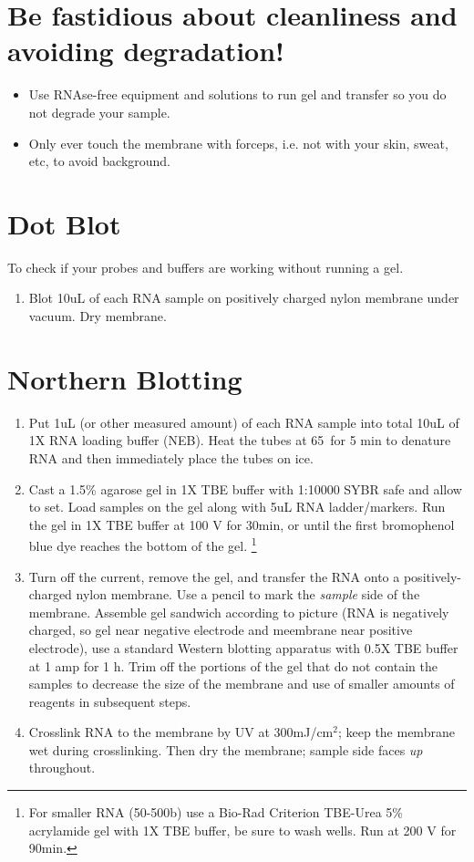 \documentclass{article}
\begin{document}
\section*{Be fastidious about cleanliness and avoiding degradation!}

\begin{itemize}
\item Use RNAse-free equipment and solutions to run gel and transfer so you do not degrade your sample.
\item Only ever touch the membrane with forceps, i.e. not with your skin, sweat, etc, to avoid background.
\end{itemize}
  

\section*{Dot Blot}

To check if your probes and buffers are working without running a gel.

\begin{enumerate}
\item Blot 10uL of each RNA sample on positively charged nylon membrane under vacuum. Dry membrane.
\end{enumerate}

\section*{Northern Blotting}
\begin{enumerate}
\item Put 1uL (or other measured amount) of each RNA sample into total 10uL of 1X RNA loading buffer (NEB). Heat the tubes at 65\celsius\  for 5 min to denature RNA and then immediately place the tubes on ice. 
\item Cast a 1.5\% agarose gel in 1X TBE buffer with 1:10000 SYBR safe and allow to set.
Load samples on the gel along with 5uL RNA ladder/markers. Run the gel in 1X TBE buffer at 100 V for 30min, or until the first bromophenol blue dye reaches the bottom of the gel. 
\footnote{ For smaller RNA (50-500b) use a Bio-Rad Criterion TBE-Urea 5\% acrylamide gel with 1X TBE buffer, be sure to wash wells. Run at 200 V for 90min.}
\item Turn off the current, remove the gel, and transfer the RNA onto a positively-charged nylon membrane. Use a pencil to mark the \emph{sample} side of the membrane. Assemble gel sandwich according to picture (RNA is negatively charged, so gel near negative electrode and meembrane near positive electrode), use a standard Western blotting apparatus with 0.5X TBE buffer at 1 amp for 1 h. Trim off the portions of the gel that do not contain the samples to decrease the size of the membrane and use of smaller amounts of reagents in subsequent steps.
\item Crosslink RNA to the membrane by UV at  300mJ/cm$^2$; keep the membrane wet during crosslinking. Then dry the membrane; sample side faces \emph{up} throughout.
\end{enumerate}
\end{document}
